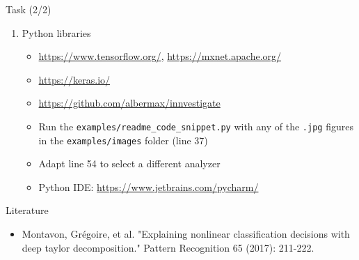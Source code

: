 \documentclass{beamer}
\begin{document}
\begin{frame}{Task (2/2)}

\begin{enumerate}
\item Python libraries
	\begin{itemize}
		\item \url{https://www.tensorflow.org/}, \url{https://mxnet.apache.org/}
		\item \url{https://keras.io/}
		\item \url{https://github.com/albermax/innvestigate}
		\item Run the \texttt{examples/readme\_code\_snippet.py} with any of the \texttt{.jpg} figures in the \texttt{examples/images} folder (line 37)
		\item Adapt line 54 to select a different analyzer
		\item Python IDE: \url{https://www.jetbrains.com/pycharm/}
	\end{itemize}
\end{enumerate}

\end{frame}

\begin{frame}{Literature}

\begin{itemize}
	\item Montavon, Grégoire, et al. "Explaining nonlinear classification decisions with deep taylor decomposition." Pattern Recognition 65 (2017): 211-222.
\end{itemize}

\end{frame}
\end{document}
